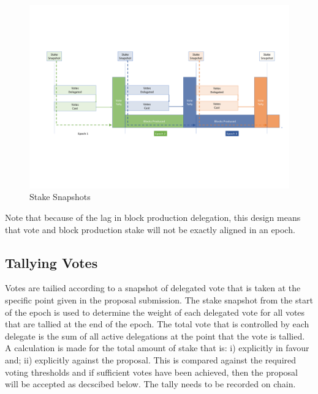 \begin{figure}
  \includegraphics[trim=0 150 0 80,clip,width=\textwidth]{Stake-Snapshots}
  \caption{Stake Snapshots}
  \label{fig:stake-snapshots}
\end{figure}

Note that because of the lag in block production delegation, this design means that vote and block production stake will not be exactly aligned in an epoch.

 

\subsection{Tallying Votes}

Votes are tailied according to a snapshot of delegated vote that is taken at the specific point given in the proposal submission.  The stake snapshot from the start of the epoch is used to determine
the weight of each delegated vote for all votes that are tallied at the end of the epoch.  The total vote that is controlled by each delegate is the sum of all active delegations at the point that
the vote is tallied.  A calculation is made for the total amount of stake that is: i) explicitly in favour and; ii) explicitly against the proposal.  This is compared against the required voting thresholds and
if sufficient votes have been achieved, then the proposal will be accepted as decscibed below.
The tally needs to be recorded on chain.

